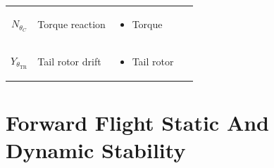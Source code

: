 \documentclass[
]{book}
\providecommand{\tightlist}{%
  \setlength{\itemsep}{0pt}\setlength{\parskip}{0pt}}
\begin{document}
\begin{longtable}[]{@{}cllc@{}}
\begin{minipage}[t]{0.26\columnwidth}
\(N_{\theta_C}\)\strut
\end{minipage} & \begin{minipage}[t]{0.16\columnwidth}\raggedright
Torque reaction\strut
\end{minipage} & \begin{minipage}[t]{0.30\columnwidth}\raggedright
\begin{itemize}
\tightlist
\item
  Torque
\end{itemize}\strut
\end{minipage} & \begin{minipage}[t]{0.17\columnwidth}\centering
~\strut
\end{minipage}\tabularnewline
\begin{minipage}[t]{0.26\columnwidth}\centering
\(Y_{\theta_{\text{TR}}}\)\strut
\end{minipage} & \begin{minipage}[t]{0.16\columnwidth}\raggedright
Tail rotor drift\strut
\end{minipage} & \begin{minipage}[t]{0.30\columnwidth}\raggedright
\begin{itemize}
\tightlist
\item
  Tail rotor
\end{itemize}\strut
\end{minipage} & \begin{minipage}[t]{0.17\columnwidth}\centering
~\strut
\end{minipage}\tabularnewline
\bottomrule
\end{longtable}

\hypertarget{forward-flight-static-and-dynamic-stability}{%
\section{Forward Flight Static And Dynamic Stability~}\label{forward-flight-static-and-dynamic-stability}}
\end{document}
